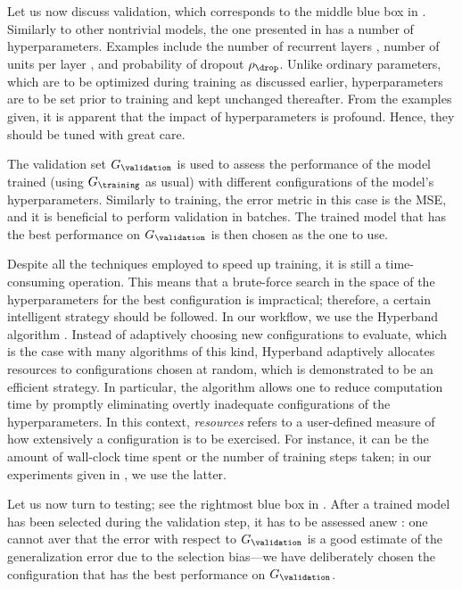 Let us now discuss validation, which corresponds to the middle blue box in
. Similarly to other nontrivial models, the one presented
in  has a number of hyperparameters. Examples
include the number of recurrent layers \nl, number of units per layer \nu, and
probability of dropout $\rho_\drop$. Unlike ordinary parameters, which are to be
optimized during training as discussed earlier, hyperparameters are to be set
prior to training and kept unchanged thereafter. From the examples given, it is
apparent that the impact of hyperparameters is profound. Hence, they should be
tuned with great care.

The validation set $G_\validation$ is used to assess the performance of the
model trained (using $G_\training$ as usual) with different configurations of
the model's hyperparameters. Similarly to training, the error metric in this
case is the \ac{MSE}, and it is beneficial to perform validation in batches. The
trained model that has the best performance on $G_\validation$ is then chosen as
the one to use.

Despite all the techniques employed to speed up training, it is still a
time-consuming operation. This means that a brute-force search in the space of
the hyperparameters for the best configuration is impractical; therefore, a
certain intelligent strategy should be followed. In our workflow, we use the
Hyperband algorithm \cite{li2016}. Instead of adaptively choosing new
configurations to evaluate, which is the case with many algorithms of this kind,
Hyperband adaptively allocates resources to configurations chosen at random,
which is demonstrated to be an efficient strategy. In particular, the algorithm
allows one to reduce computation time by promptly eliminating overtly inadequate
configurations of the hyperparameters. In this context, \emph{resources} refers
to a user-defined measure of how extensively a configuration is to be exercised.
For instance, it can be the amount of wall-clock time spent or the number of
training steps taken; in our experiments given in , we use
the latter.

Let us now turn to testing; see the rightmost blue box in .
After a trained model has been selected during the validation step, it has to be
assessed anew \cite{hastie2013}: one cannot aver that the error with respect to
$G_\validation$ is a good estimate of the generalization error due to the
selection bias---we have deliberately chosen the configuration that has the best
performance on $G_\validation$.

